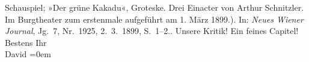 \begin{ledgroupsized}[t]{13cm}
{{{{                        Schauspiel; »Der grüne Kakadu«, Groteske. Drei Einacter von Arthur
                        Schnitzler. Im Burgtheater zum erstenmale aufgeführt am 1. März 1899.)}.
                     In: \emph{Neues Wiener Journal}, Jg. 7, Nr. 1925,
                        2. 3. 1899, S. 1–2.}}}\label{K_L00897_2h}. Unsere Kritik! Ein feines
               Capitel! \pend
           \pstart
           Bestens Ihr{\\[\baselineskip]}\spacefill\mbox{David}\pend
           \leftskip=0em{}
         
         \endnumbering{}\end{ledgroupsized}  \newcommand{\dateiname}{L00897}\newcommand{\titel}{Jakob Julius David an Arthur Schnitzler, 3. 3. 1899}\newcommand{\editorInnen}{Martin Anton Müller und Gerd-Hermann Susen}
      